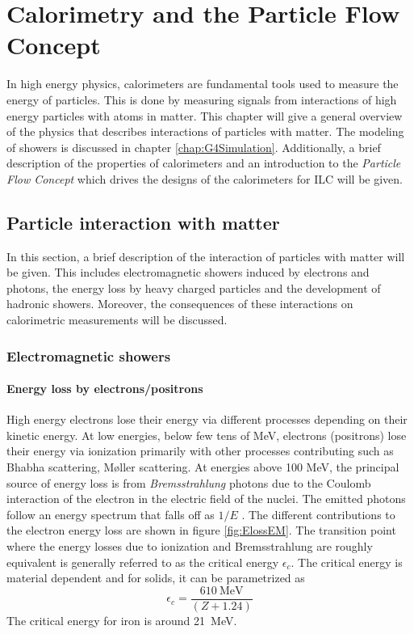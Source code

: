 \chapter{Calorimetry and the Particle Flow Concept}
\label{chap:CaloPFA}

In high energy physics, calorimeters are fundamental tools used to measure the energy of particles. This is done by measuring signals from interactions of high energy particles with atoms in matter. This chapter will give a general overview of the physics that describes interactions of particles with matter. The modeling of showers is discussed in chapter \ref{chap:G4Simulation}. Additionally, a brief description of the properties of calorimeters and an introduction to the \textit{Particle Flow Concept} which drives the designs of the calorimeters for ILC will be given.

\section{Particle interaction with matter}
\label{sec:PartInter}

In this section, a brief description of the interaction of particles with matter will be given. This includes electromagnetic showers induced by electrons and photons, the energy loss by heavy charged particles and the development of hadronic showers. Moreover, the consequences of these interactions on calorimetric measurements will be discussed.

\subsection{Electromagnetic showers}
\label{subsec:EMShowers}

\subsubsection{Energy loss by electrons/positrons}

High energy electrons lose their energy via different processes depending on their kinetic energy. At low energies, below few tens of MeV, electrons (positrons) lose their energy via ionization primarily with other processes contributing such as Bhabha scattering, M\o{}ller scattering. At energies above 100 MeV, the principal source of energy loss is from \textit{Brems\-strah\-lung} photons due to the Coulomb interaction of the electron in the electric field of the nuclei. The emitted photons follow an energy spectrum that falls off as $1/E$ \cite{Wigmans:392793}. The different contributions to the electron energy loss are shown in figure \ref{fig:ElossEM}. The transition point where the energy losses due to ionization and Bremsstrahlung are roughly equivalent is generally referred to as the critical energy $\epsilon_{c}$. The critical energy is material dependent and for solids, it can be parametrized as
\begin{equation}
  \epsilon_{c} = \frac{\SI{610}{\mega\eV}}{(Z + 1.24)}
\end{equation}
The critical energy for iron is around \SI{21}{\mega\eV}.

